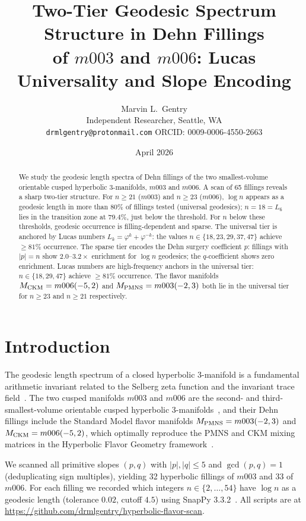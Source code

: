 \documentclass[12pt]{article}
\title{Two-Tier Geodesic Spectrum Structure in Dehn Fillings\\
of $m003$ and $m006$: Lucas Universality and Slope Encoding}
\author{Marvin L.\ Gentry\\
\small Independent Researcher, Seattle, WA\\
\small \texttt{drmlgentry@protonmail.com}\quad
ORCID: 0009-0006-4550-2663}
\date{April 2026}
\theoremstyle{definition}
\newcommand{\ph}{\varphi}
\begin{document}
\maketitle

\begin{abstract}
We study the geodesic length spectra of Dehn fillings of the two
smallest-volume orientable cusped hyperbolic 3-manifolds, $m003$ and
$m006$. A scan of 65 fillings reveals a sharp two-tier structure.
For $n \ge 21$ ($m003$) and $n \ge 23$ ($m006$), $\log n$
appears as a geodesic length in more than $80\%$ of fillings tested
(universal geodesics); $n=18=L_6$ lies in the transition zone
at $79.4\%$, just below the threshold. For $n$ below these thresholds, geodesic
occurrence is filling-dependent and sparse. The universal tier is
anchored by Lucas numbers $L_k = \ph^k + \ph^{-k}$: the values
$n \in \{18, 23, 29, 37, 47\}$ achieve $\ge 81\%$ occurrence.
The sparse tier encodes the Dehn surgery coefficient $p$: fillings
with $|p| = n$ show $2.0$--$3.2\times$ enrichment for $\log n$
geodesics; the $q$-coefficient shows zero enrichment. Lucas numbers are high-frequency anchors in the universal tier:
$n\in\{18,29,47\}$ achieve $\ge 81\%$ occurrence.
The flavor manifolds $M_{\rm CKM}=m006(-5,2)$ and
$M_{\rm PMNS}=m003(-2,3)$ both lie in the universal tier
for $n\ge23$ and $n\ge21$ respectively.
\end{abstract}

\section{Introduction}

The geodesic length spectrum of a closed hyperbolic 3-manifold is a
fundamental arithmetic invariant related to the Selberg zeta function
and the invariant trace field~\cite{MaclachlanReid}. The two cusped
manifolds $m003$ and $m006$ are the second- and third-smallest-volume
orientable cusped hyperbolic 3-manifolds~\cite{GMM}, and their Dehn
fillings include the Standard Model flavor manifolds
$M_{\rm PMNS} = m003(-2,3)$ and $M_{\rm CKM} = m006(-5,2)$, which
optimally reproduce the PMNS and CKM mixing matrices in the Hyperbolic
Flavor Geometry framework~\cite{Gentry:CKM,Gentry:PMNS}.

We scanned all primitive slopes $(p,q)$ with $|p|,|q|\le 5$ and
$\gcd(p,q)=1$ (deduplicating sign multiples), yielding 32 hyperbolic
fillings of $m003$ and 33 of $m006$. For each filling we recorded which
integers $n \in \{2,\ldots,54\}$ have $\log n$ as a geodesic length
(tolerance $0.02$, cutoff $4.5$) using SnapPy 3.3.2~\cite{SnapPy}.
All scripts are at \url{https://github.com/drmlgentry/hyperbolic-flavor-scan}.
\end{document}
